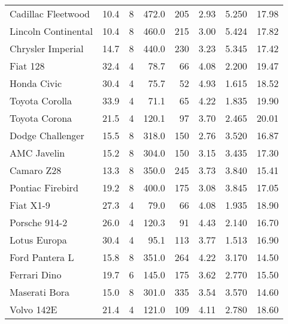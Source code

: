 \documentclass[]{book}
\begin{document}
\begin{ThreePartTable}
\begin{longtable}[t]{lrrrrrrr}
Cadillac Fleetwood & 10.4 & 8 & 472.0 & 205 & 2.93 & 5.250 & 17.98\\
Lincoln Continental & 10.4 & 8 & 460.0 & 215 & 3.00 & 5.424 & 17.82\\
Chrysler Imperial & 14.7 & 8 & 440.0 & 230 & 3.23 & 5.345 & 17.42\\
Fiat 128 & 32.4 & 4 & 78.7 & 66 & 4.08 & 2.200 & 19.47\\
\midrule
Honda Civic & 30.4 & 4 & 75.7 & 52 & 4.93 & 1.615 & 18.52\\
Toyota Corolla & 33.9 & 4 & 71.1 & 65 & 4.22 & 1.835 & 19.90\\
Toyota Corona & 21.5 & 4 & 120.1 & 97 & 3.70 & 2.465 & 20.01\\
Dodge Challenger & 15.5 & 8 & 318.0 & 150 & 2.76 & 3.520 & 16.87\\
AMC Javelin & 15.2 & 8 & 304.0 & 150 & 3.15 & 3.435 & 17.30\\
Camaro Z28 & 13.3 & 8 & 350.0 & 245 & 3.73 & 3.840 & 15.41\\
\midrule
Pontiac Firebird & 19.2 & 8 & 400.0 & 175 & 3.08 & 3.845 & 17.05\\
Fiat X1-9 & 27.3 & 4 & 79.0 & 66 & 4.08 & 1.935 & 18.90\\
Porsche 914-2 & 26.0 & 4 & 120.3 & 91 & 4.43 & 2.140 & 16.70\\
Lotus Europa & 30.4 & 4 & 95.1 & 113 & 3.77 & 1.513 & 16.90\\
Ford Pantera L & 15.8 & 8 & 351.0 & 264 & 4.22 & 3.170 & 14.50\\
Ferrari Dino & 19.7 & 6 & 145.0 & 175 & 3.62 & 2.770 & 15.50\\
\midrule
Maserati Bora & 15.0 & 8 & 301.0 & 335 & 3.54 & 3.570 & 14.60\\
Volvo 142E & 21.4 & 4 & 121.0 & 109 & 4.11 & 2.780 & 18.60\\*
\end{longtable}
\end{ThreePartTable}
\end{document}
